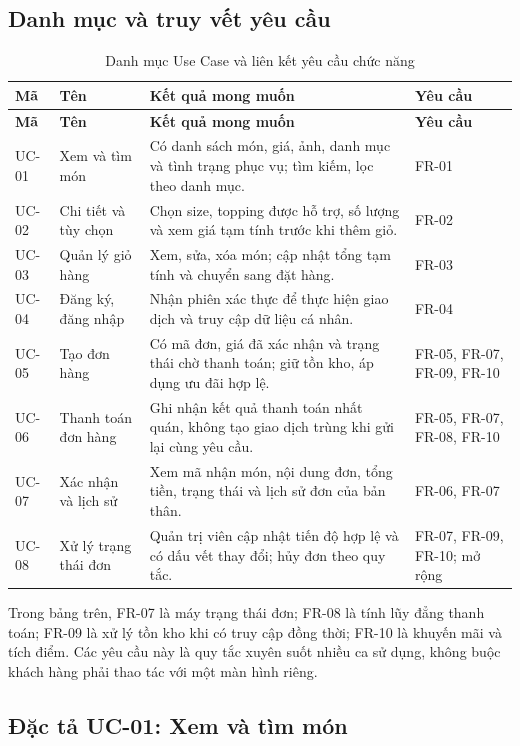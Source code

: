 \subsection{Danh mục và truy vết yêu cầu}

\begin{longtable}{|p{1.3cm}|p{3.6cm}|p{6.3cm}|p{2.7cm}|}
\caption{Danh mục Use Case và liên kết yêu cầu chức năng}
\label{tab:uc-catalog}\\ \hline
\textbf{Mã} & \textbf{Tên} & \textbf{Kết quả mong muốn} & \textbf{Yêu cầu} \\ \hline
\endfirsthead
\hline \textbf{Mã} & \textbf{Tên} & \textbf{Kết quả mong muốn} & \textbf{Yêu cầu} \\ \hline
\endhead
UC-01 & Xem và tìm món & Có danh sách món, giá, ảnh, danh mục và tình trạng
phục vụ; tìm kiếm, lọc theo danh mục. & FR-01 \\ \hline
UC-02 & Chi tiết và tùy chọn & Chọn size, topping được hỗ trợ, số lượng và
xem giá tạm tính trước khi thêm giỏ. & FR-02 \\ \hline
UC-03 & Quản lý giỏ hàng & Xem, sửa, xóa món; cập nhật tổng tạm tính và
chuyển sang đặt hàng. & FR-03 \\ \hline
UC-04 & Đăng ký, đăng nhập & Nhận phiên xác thực để thực hiện giao dịch và
truy cập dữ liệu cá nhân. & FR-04 \\ \hline
UC-05 & Tạo đơn hàng & Có mã đơn, giá đã xác nhận và trạng thái chờ thanh
toán; giữ tồn kho, áp dụng ưu đãi hợp lệ. & FR-05, FR-07, FR-09, FR-10 \\ \hline
UC-06 & Thanh toán đơn hàng & Ghi nhận kết quả thanh toán nhất quán,
không tạo giao dịch trùng khi gửi lại cùng yêu cầu. & FR-05, FR-07, FR-08, FR-10 \\ \hline
UC-07 & Xác nhận và lịch sử & Xem mã nhận món, nội dung đơn, tổng tiền,
trạng thái và lịch sử đơn của bản thân. & FR-06, FR-07 \\ \hline
UC-08 & Xử lý trạng thái đơn & Quản trị viên cập nhật tiến độ hợp lệ và có
dấu vết thay đổi; hủy đơn theo quy tắc. & FR-07, FR-09, FR-10; mở rộng \\ \hline
\end{longtable}

Trong bảng trên, FR-07 là máy trạng thái đơn; FR-08 là tính lũy đẳng
thanh toán; FR-09 là xử lý tồn kho khi có truy cập đồng thời; FR-10 là
khuyến mãi và tích điểm. Các yêu cầu này là quy tắc xuyên suốt nhiều ca
sử dụng, không buộc khách hàng phải thao tác với một màn hình riêng.

\subsection{Đặc tả UC-01: Xem và tìm món}
\label{uc:01}
\label{uc01}

